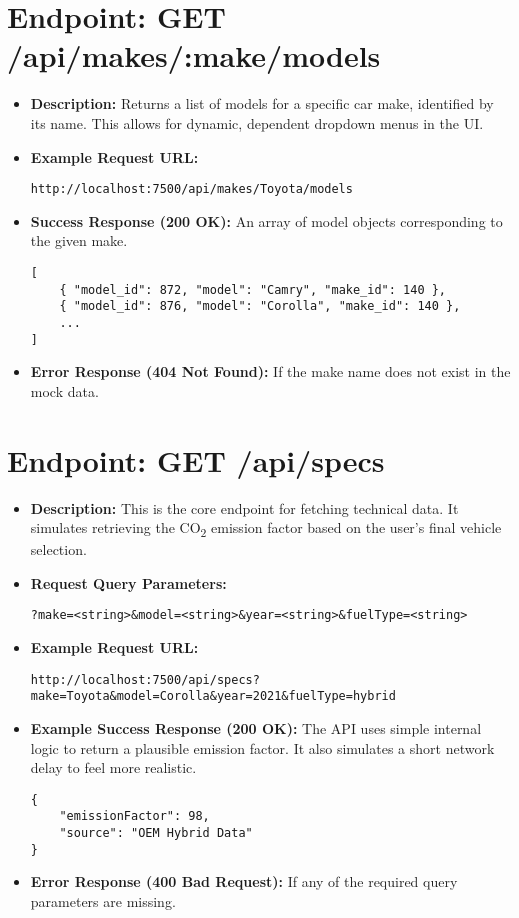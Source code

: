 \section{Endpoint: GET /api/makes/:make/models}
\begin{itemize}
    \item \textbf{Description:} Returns a list of models for a specific car make, identified by its name. This allows for dynamic, dependent dropdown menus in the UI.
    \item \textbf{Example Request URL:}
    \begin{verbatim}
http://localhost:7500/api/makes/Toyota/models
    \end{verbatim}
    \item \textbf{Success Response (200 OK):} An array of model objects corresponding to the given make.
    \begin{verbatim}
[
    { "model_id": 872, "model": "Camry", "make_id": 140 },
    { "model_id": 876, "model": "Corolla", "make_id": 140 },
    ...
]
    \end{verbatim}
    \item \textbf{Error Response (404 Not Found):} If the make name does not exist in the mock data.
\end{itemize}

\section{Endpoint: GET /api/specs}
\begin{itemize}
    \item \textbf{Description:} This is the core endpoint for fetching technical data. It simulates retrieving the CO\textsubscript{2} emission factor based on the user's final vehicle selection.
    \item \textbf{Request Query Parameters:}
    \begin{verbatim}
?make=<string>&model=<string>&year=<string>&fuelType=<string>
    \end{verbatim}
    \item \textbf{Example Request URL:}
    \begin{verbatim}
http://localhost:7500/api/specs?make=Toyota&model=Corolla&year=2021&fuelType=hybrid
    \end{verbatim}
    \item \textbf{Example Success Response (200 OK):} The API uses simple internal logic to return a plausible emission factor. It also simulates a short network delay to feel more realistic.
    \begin{verbatim}
{
    "emissionFactor": 98,
    "source": "OEM Hybrid Data"
}
    \end{verbatim}
    \item \textbf{Error Response (400 Bad Request):} If any of the required query parameters are missing.
\end{itemize}
